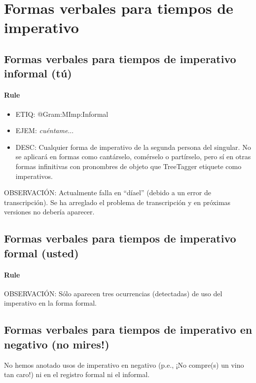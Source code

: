\documentclass[11pt]{report}
\begin{document}
\section{Formas verbales para tiempos de imperativo}
\subsection{Formas verbales para tiempos de imperativo informal (tú)}
\paragraph*{Rule}
\begin{itemize}
\item ETIQ: @Gram:MImp:Informal
\item EJEM: \emph{cuéntame}... 
\item DESC: Cualquier forma de imperativo de la segunda persona del singular. No se aplicará en formas como cantárselo, comérselo o partírselo, pero sí en otras formas infinitivas con pronombres de objeto que TreeTagger etiquete como imperativos.
\end{itemize}

OBSERVACIÓN: Actualmente falla en ``díael'' (debido a un error de transcripción). Se ha arreglado el problema de transcripción y en próximas versiones no debería aparecer.

\subsection{Formas verbales para tiempos de imperativo formal (usted)}
\paragraph*{Rule}
OBSERVACIÓN: Sólo aparecen tres ocurrencias (detectadas) de uso del imperativo en la forma formal.

\subsection{Formas verbales para tiempos de imperativo en negativo (no mires!)}
No hemos anotado usos de imperativo en negativo (p.e., ¡No compre(s) un vino tan caro!) ni en el registro formal ni el informal.
\end{document}
